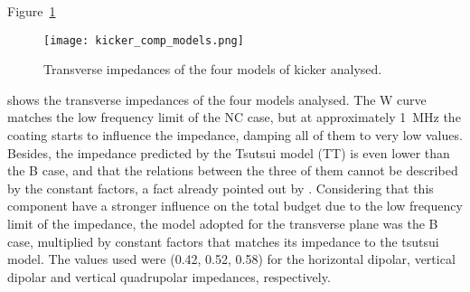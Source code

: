     Figure~\ref{fig:uncoupled_flux_impedance}
    \begin{figure}
        \centering
        \texttt{[image: kicker\_comp\_models.png]}
        \caption{Transverse impedances of the four models of kicker analysed.}
        \label{fig:uncoupled_flux_impedance}
    \end{figure}
    shows the transverse impedances of the four models analysed. The W curve matches the low frequency limit of the NC case, but at approximately \SI{1}{\mega\hertz} the coating starts to influence the impedance, damping all of them to very low values. Besides, the impedance predicted by the Tsutsui model (TT) is even lower than the B case, and that the relations between the three of them cannot be described by the constant  factors, a fact already pointed out by . Considering that this component have a stronger influence on the total budget due to the low frequency limit of the impedance, the model adopted for the transverse plane was the B case, multiplied by constant factors that matches its impedance to the tsutsui model. The values used were (0.42, 0.52, 0.58) for the horizontal dipolar, vertical dipolar and vertical quadrupolar impedances, respectively.

